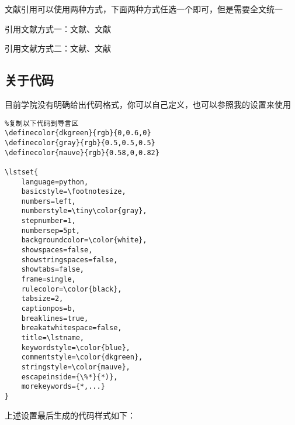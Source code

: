文献引用可以使用两种方式，下面两种方式任选一个即可，但是需要全文统一

引用文献方式一：文献\cite{Chase_LangChain_2022}、文献\cite{wang2024executable}

引用文献方式二：文献\parencite{Elovic_gpt-researcher_2023}、文献\parencite{smolagents}

\subsection{关于代码}

\par 目前学院没有明确给出代码格式，你可以自己定义，也可以参照我的设置来使用
\begin{verbatim}
%复制以下代码到导言区
\definecolor{dkgreen}{rgb}{0,0.6,0}
\definecolor{gray}{rgb}{0.5,0.5,0.5}
\definecolor{mauve}{rgb}{0.58,0,0.82}

\lstset{ 
    language=python,                
    basicstyle=\footnotesize,       
    numbers=left,                   
    numberstyle=\tiny\color{gray}, 
    stepnumber=1,                   
    numbersep=5pt,                  
    backgroundcolor=\color{white}, 
    showspaces=false,              
    showstringspaces=false,         
    showtabs=false,                 
    frame=single,                   
    rulecolor=\color{black},        
    tabsize=2,                      
    captionpos=b,                   
    breaklines=true,                
    breakatwhitespace=false,        
    title=\lstname,                   
    keywordstyle=\color{blue},          
    commentstyle=\color{dkgreen},       
    stringstyle=\color{mauve},         
    escapeinside={\%*}{*)},            
    morekeywords={*,...}               
}
\end{verbatim}


上述设置最后生成的代码样式如下：

